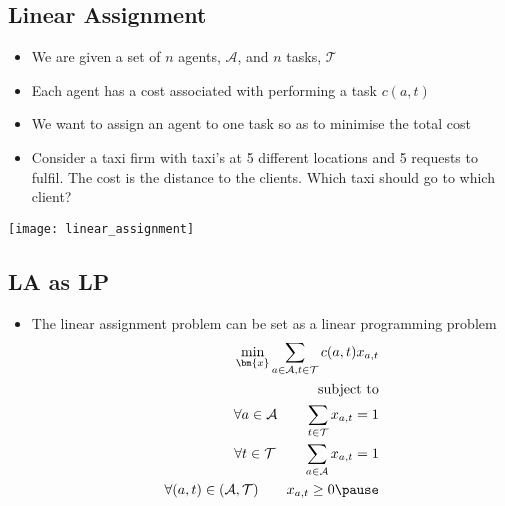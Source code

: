 
\begin{slide}
\section[-1]{Linear Assignment}

\begin{PauseHighLight}
  \begin{minipage}{0.7\linewidth}
    \begin{itemize}
    \item We are given a set of $n$ agents, $\mathcal{A}$, and $n$ tasks,
      $\mathcal{T}$\pause
    \item Each agent has a cost associated with performing a task
      $c(a,t)$\pause
    \item We want to assign an agent to one task so as to minimise the
      total cost\pause
    \item Consider a taxi firm with taxi's at 5 different locations and 5
      requests to fulfil.  The cost is the distance to the clients.  Which
      taxi should go to which client?\pause
    \end{itemize}
  \end{minipage}\hfill
  \begin{minipage}{0.25\linewidth}
    \texttt{[image: linear\_assignment]}
  \end{minipage}
\end{PauseHighLight}

\end{slide}


\begin{slide}
\section[-1]{LA as LP}

\begin{PauseHighLight}
  \begin{itemize}
  \item The linear assignment problem can be set as a linear programming
    problem
    \begin{align*}
      \min_{\bm{x}} \sum_{a\in\mathcal{A}, t\in\mathcal{T}} c(a,t)
      x_{a,t}\\
      \text{subject to}\\
      \forall a\in\mathcal{A} \quad \quad \sum_{t\in\mathcal{T}} x_{a,t}
      = 1 \\
      \forall  t\in\mathcal{T} \quad \quad \sum_{a\in\mathcal{A}} x_{a,t}
      = 1 \\
      \forall (a,t)\in(\mathcal{A},\mathcal{T}) \quad \quad x_{a,t}\geq 0\pause
    \end{align*}
  \end{itemize}
\end{PauseHighLight}

\end{slide}


